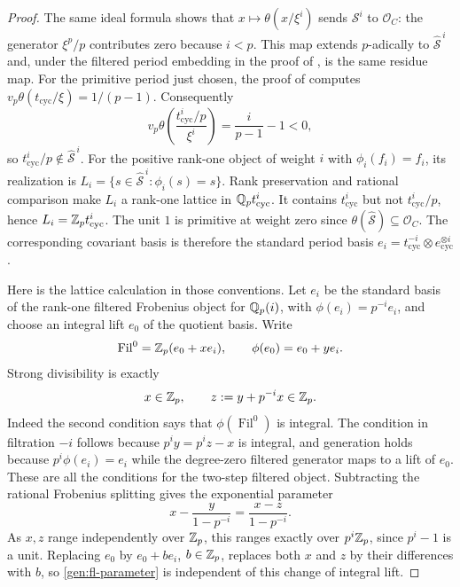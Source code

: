 \begin{proof}
The same ideal formula shows that
$x\mapsto\theta(x/\xi^i)$ sends $\mathscr S^i$ to $\mathcal O_C$:
the generator $\xi^p/p$ contributes zero because $i<p$.
This map extends $p$-adically to $\widehat{\mathscr S}^{\,i}$ and,
under the filtered period embedding in the proof of
\cite[Theorem~8.4(ii)]{FontaineLaffaille}, is the same residue map.
For the primitive period just chosen, the proof of
\cite[Proposition~2.17, pp.~543--544]{FontaineBarsottiTate} computes
$v_p\theta(t_{\mathrm{cyc}}/\xi)=1/(p-1)$.  Consequently
\[
 v_p\theta\left(\frac{t_{\mathrm{cyc}}^i/p}{\xi^i}\right)
 =\frac{i}{p-1}-1<0,
\]
so $t_{\mathrm{cyc}}^i/p\notin\widehat{\mathscr S}^{\,i}$.
For the positive rank-one object of weight $i$ with $\phi_i(f_i)=f_i$, its
realization is
$L_i=\{s\in\widehat{\mathscr S}^{\,i}:\phi_i(s)=s\}$.
Rank preservation and rational comparison make $L_i$ a rank-one
lattice in $\mathbb Q_p t_{\mathrm{cyc}}^i$.  It contains
$t_{\mathrm{cyc}}^i$ but not $t_{\mathrm{cyc}}^i/p$, hence
$L_i=\mathbb Z_p t_{\mathrm{cyc}}^i$.  The unit $1$ is primitive at weight
zero since $\theta(\widehat{\mathscr S})\subseteq\mathcal O_C$.
The corresponding covariant basis is therefore the
standard period basis
$e_i=t_{\mathrm{cyc}}^{-i}\otimes e_{\mathrm{cyc}}^{\otimes i}$.

Here is the lattice calculation in those conventions.  Let $e_i$ be
the standard basis of the rank-one filtered Frobenius object for
$\mathbb Q_p(i)$, with $\phi(e_i)=p^{-i}e_i$, and choose an integral lift
$e_0$ of the quotient basis.  Write
\[
 \operatorname{Fil}^0=\mathbb Z_p(e_0+x e_i),
 \qquad \phi(e_0)=e_0+y e_i.
\]
Strong divisibility is exactly
\begin{equation}\label{gen:fl-conditions}
 x\in\mathbb Z_p,\qquad z:=y+p^{-i}x\in\mathbb Z_p.
\end{equation}
Indeed the second condition says that $\phi(\operatorname{Fil}^0)$
is integral.  The condition in filtration $-i$ follows because
$p^iy=p^iz-x$ is integral, and generation holds because
$p^i\phi(e_i)=e_i$ while the degree-zero filtered generator maps to
a lift of $e_0$.  These are all the conditions for the two-step
filtered object.  Subtracting the rational Frobenius splitting gives
the exponential parameter
\begin{equation}\label{gen:fl-parameter}
 x-\frac{y}{1-p^{-i}}
   =\frac{x-z}{1-p^{-i}}.
\end{equation}
As $x,z$ range independently over $\mathbb Z_p$, this ranges exactly over
$p^i\mathbb Z_p$, since $p^i-1$ is a unit.  Replacing $e_0$ by
$e_0+b e_i$, $b\in\mathbb Z_p$, replaces both $x$ and $z$ by their
differences with $b$, so \eqref{gen:fl-parameter} is independent of
this change of integral lift.


\end{proof}
